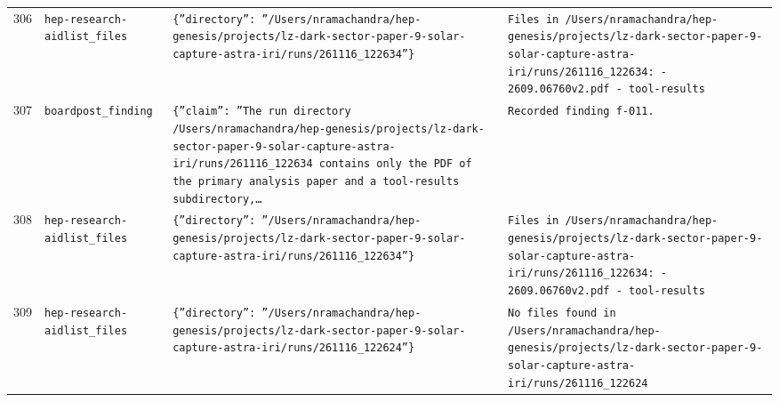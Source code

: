\documentclass[11pt,a4paper]{article}
\begin{document}
\begin{longtable}{@{}p{}p{}p{}p{}@{}}
306 & \texttt{hep-research-aid}\newline\texttt{list\_\allowbreak{}files} & \texttt{\{''directory'':\allowbreak{} ''/\allowbreak{}Users/\allowbreak{}nramachandra/\allowbreak{}hep-genesis/\allowbreak{}projects/\allowbreak{}lz-dark-sector-paper-9-solar-capture-astra-iri/\allowbreak{}runs/\allowbreak{}261116\_\allowbreak{}122634''\}\allowbreak{}} & \texttt{Files in /\allowbreak{}Users/\allowbreak{}nramachandra/\allowbreak{}hep-genesis/\allowbreak{}projects/\allowbreak{}lz-dark-sector-paper-9-solar-capture-astra-iri/\allowbreak{}runs/\allowbreak{}261116\_\allowbreak{}122634:\allowbreak{}   - 2609.06760v2.pdf   - tool-results} \\
307 & \texttt{board}\newline\texttt{post\_\allowbreak{}finding} & \texttt{\{''claim'':\allowbreak{} ''The run directory /\allowbreak{}Users/\allowbreak{}nramachandra/\allowbreak{}hep-genesis/\allowbreak{}projects/\allowbreak{}lz-dark-sector-paper-9-solar-capture-astra-iri/\allowbreak{}runs/\allowbreak{}261116\_\allowbreak{}122634 contains only the PDF of the primary analysis paper and a tool-results subdirectory,\allowbreak{}\ldots{}\allowbreak{}} & \texttt{Recorded finding f-011.} \\
308 & \texttt{hep-research-aid}\newline\texttt{list\_\allowbreak{}files} & \texttt{\{''directory'':\allowbreak{} ''/\allowbreak{}Users/\allowbreak{}nramachandra/\allowbreak{}hep-genesis/\allowbreak{}projects/\allowbreak{}lz-dark-sector-paper-9-solar-capture-astra-iri/\allowbreak{}runs/\allowbreak{}261116\_\allowbreak{}122634''\}\allowbreak{}} & \texttt{Files in /\allowbreak{}Users/\allowbreak{}nramachandra/\allowbreak{}hep-genesis/\allowbreak{}projects/\allowbreak{}lz-dark-sector-paper-9-solar-capture-astra-iri/\allowbreak{}runs/\allowbreak{}261116\_\allowbreak{}122634:\allowbreak{}   - 2609.06760v2.pdf   - tool-results} \\
309 & \texttt{hep-research-aid}\newline\texttt{list\_\allowbreak{}files} & \texttt{\{''directory'':\allowbreak{} ''/\allowbreak{}Users/\allowbreak{}nramachandra/\allowbreak{}hep-genesis/\allowbreak{}projects/\allowbreak{}lz-dark-sector-paper-9-solar-capture-astra-iri/\allowbreak{}runs/\allowbreak{}261116\_\allowbreak{}122624''\}\allowbreak{}} & \texttt{No files found in /\allowbreak{}Users/\allowbreak{}nramachandra/\allowbreak{}hep-genesis/\allowbreak{}projects/\allowbreak{}lz-dark-sector-paper-9-solar-capture-astra-iri/\allowbreak{}runs/\allowbreak{}261116\_\allowbreak{}122624} \\

\end{longtable}
\end{document}
